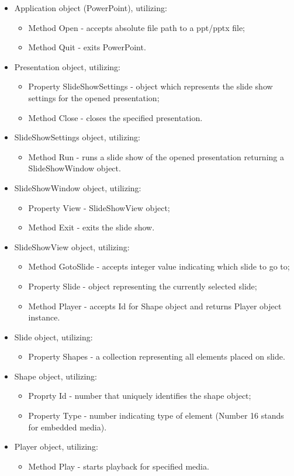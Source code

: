 \documentclass[12pt, fleqn, a4paper]{article}
\begin{document}
\begin{itemize}
	\item Application object (PowerPoint), utilizing:
		\begin{itemize}
			\item Method Open - accepts absolute file path to a ppt/pptx file;
			\item Method Quit - exits PowerPoint.
		\end{itemize}
	\item Presentation object, utilizing:
		\begin{itemize}
			\item Property SlideShowSettings - object which represents the slide show settings for the opened presentation;
			\item Method Close - closes the specified presentation.
		\end{itemize}
	\item SlideShowSettings object, utilizing:
		\begin{itemize}
			\item Method Run - runs a slide show of the opened presentation returning a SlideShowWindow object.
		\end{itemize}
	\item SlideShowWindow object, utilizing:
		\begin{itemize}
			\item Property View - SlideShowView object;
			\item Method Exit - exits the slide show.
		\end{itemize}
	\item SlideShowView object, utilizing:
		\begin{itemize}
			\item Method GotoSlide - accepts integer value indicating which slide to go to;
			\item Property Slide - object representing the currently selected slide;
			\item Method Player - accepts Id for Shape object and returns Player object instance.
		\end{itemize}
	\item Slide object, utilizing:
		\begin{itemize}
			\item Property Shapes - a collection representing all elements placed on slide.
		\end{itemize}
	\item Shape object, utilizing:
		\begin{itemize}
			\item Proprty Id - number that uniquely identifies the shape object;
			\item Property Type - number indicating type of element (Number 16 stands for embedded media).
		\end{itemize}
	\item Player object, utilizing:
		\begin{itemize}
			\item Method Play - starts playback for specified media.
		\end{itemize}
\end{itemize}
\end{document}
